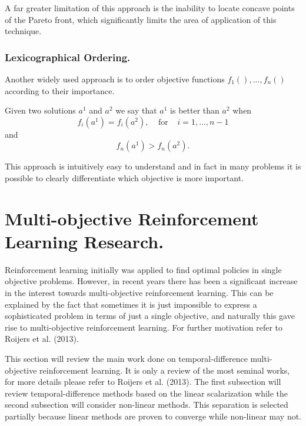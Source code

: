 A far greater limitation of this approach is the inability to locate concave points of the Pareto front, which significantly limits the area of application of this technique.

\subsubsection{Lexicographical Ordering.}
Another widely used approach is to order objective functions $ f_{1}(),...,f_{n}() $ according to their importance.

Given two solutions $a^{1}$ and $a^{2}$ we say that $a^{1}$ is better than $a^{2}$ when $$ f_{i}(a^{1}) = f_{i}(a^{2}), \;\;\;\;\text{for}\;\;\;\; i = 1,...,n-1$$
and
$$ f_{n}(a^{1}) > f_{n}(a^{2}). $$

This approach is intuitively easy to understand and in fact in many problems it is possible to clearly differentiate which objective is more important.

\section{Multi-objective Reinforcement Learning Research.}

Reinforcement learning initially was applied to find optimal policies in single objective problems. However, in recent years there has been a significant increase in the interest towards multi-objective reinforcement learning. This can be explained by the fact that sometimes it is just impossible to express a sophisticated problem in terms of just a single objective, and naturally this gave rise to multi-objective reinforcement learning. For further motivation refer to Roijers et al. (2013)\nocite{roijers2013survey}.

This section will review the main work done on temporal-difference multi-objective reinforcement learning. It is only a review of the most seminal works, for more details please refer to Roijers et al. (2013)\nocite{roijers2013survey}. The first subsection will review temporal-difference methods based on the linear scalarization while the second subsection will consider non-linear methods. This separation is selected partially because linear methods are proven to converge while non-linear may not.

